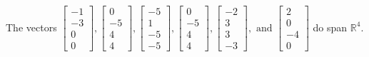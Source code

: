 \begin{exercise}
\begin{exerciseStatement}
  \end{exerciseStatement}
  \begin{exerciseAnswer}
   The vectors \(\left[\begin{array}{r}
-1 \\
-3 \\
0 \\
0
\end{array}\right] , \left[\begin{array}{r}
0 \\
-5 \\
4 \\
4
\end{array}\right] , \left[\begin{array}{r}
-5 \\
1 \\
-5 \\
-5
\end{array}\right] , \left[\begin{array}{r}
0 \\
-5 \\
4 \\
4
\end{array}\right] , \left[\begin{array}{r}
-2 \\
3 \\
3 \\
-3
\end{array}\right] , \text{ and } \left[\begin{array}{r}
2 \\
0 \\
-4 \\
0
\end{array}\right]\) 
  	 do  
	span \(\mathbb{R}^4\).
  


  \end{exerciseAnswer}
\end{exercise}